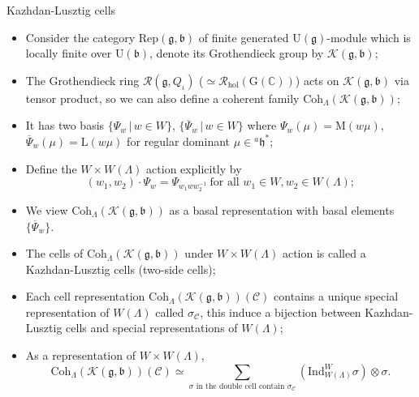 \documentclass[fleqn,xcolor=dvipsnames]{beamer}
\newcommand{\BC}{{\mathbb {C}}}
\newcommand{\CC}{{\mathcal {C}}}
\newcommand{\CK}{{\mathcal {K}}}
\newcommand{\CR}{{\mathcal {R}}}
\newcommand{\RG}{{\mathrm {G}}}
\newcommand{\RL}{{\mathrm {L}}}
\newcommand{\RM}{{\mathrm {M}}}
\newcommand{\fb}{\mathfrak{b}}
\newcommand{\fg}{\mathfrak{g}}
\newcommand{\fh}{\mathfrak{h}}
\newcommand{\U}{{\mathrm{U}}}
\newcommand{\Ind}{{\mathrm{Ind}}}
\newcommand{\Rep}{{\mathrm{Rep}}}
\newcommand{\set}[2]{\{#1\,|\,#2\}}
\renewcommand{\bar}{\overline}
\begin{document}
\begin{frame}{Kazhdan-Lusztig cells}
  \begin{itemize}
    \item Consider the category $\Rep(\fg,\fb)$ of finite generated $\U(\fg)$-module which is locally finite over $\U(\fb)$, denote its Grothendieck group by $\CK(\fg,\fb)$;
    \pause\item The Grothendieck ring $\CR(\fg,Q_{\iota})$ ($\simeq \CR_{\mathrm{hol}}(\RG(\BC))$) acts on $\CK(\fg,\fb)$ via tensor product, so we can also define a coherent family $\mathrm{Coh}_{\Lambda}(\CK(\fg,\fb))$;
    \pause\item It has two basis $\set{\Psi_w}{w \in W}$, $\set{\bar{\Psi}_{w}}{w \in W}$ where $\Psi_w(\mu) = \RM(w\mu)$, $\bar{\Psi}_{w}(\mu) = \RL(w\mu)$ for regular dominant $\mu \in {^{a}\fh}^*$;
    \pause\item Define the $W \times W(\Lambda)$ action explicitly by \[(w_1,w_2) \cdot \Psi_w = \Psi_{w_1 w w_2^{-1}} \ \textrm{for all $w_1 \in W, w_2 \in W(\Lambda)$};\]
    \pause\item We view $\mathrm{Coh}_{\Lambda}(\CK(\fg,\fb))$ as a basal representation with basal elements $\{\bar{\Psi}_w\}$.
    
  \end{itemize}
  
\end{frame}



\begin{frame}
\begin{itemize}
  \item The cells of $\mathrm{Coh}_{\Lambda}(\CK(\fg,\fb))$ under $W \times W(\Lambda)$ action is called a \alert{Kazhdan-Lusztig cells} (two-side cells);
  \pause\item Each cell representation $\mathrm{Coh}_{\Lambda}(\CK(\fg,\fb))(\CC)$ contains a unique special representation of $W(\Lambda)$ called $\sigma_{\CC}$, this induce a bijection between Kazhdan-Lusztig cells and special representations of $W(\Lambda)$;
  \pause\item As a representation of $W \times W(\Lambda)$, \[\mathrm{Coh}_{\Lambda}(\CK(\fg,\fb))(\CC) \simeq \sum\limits_{\textrm{$\sigma$ in the double cell contain $\sigma_{\CC}$}}(\Ind_{W(\Lambda)}^{W}\sigma) \otimes \sigma.\]
\end{itemize}


  
  
\end{frame}
\end{document}
